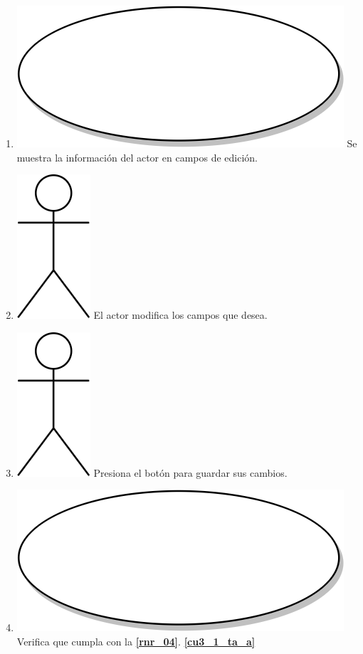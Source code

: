\begin{enumerate}
\item {\includegraphics[scale=.05]{Capitulo3/img/proceso.png} Se muestra la información del actor en campos de edición.}
\item {\includegraphics[scale=.1]{Capitulo3/img/actor.png} El actor modifica los campos que desea.}
  \item {\includegraphics[scale=.1]{Capitulo3/img/actor.png} Presiona el botón para guardar sus cambios.}
  \item {\includegraphics[scale=.05]{Capitulo3/img/proceso.png} Verifica que cumpla con la \textbf{\ref{rnr_04}}. \textbf{\ref{cu3_1_ta_a}}}

\end{enumerate}
